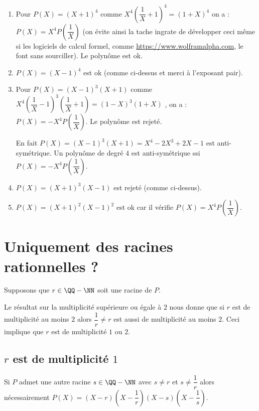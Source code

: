 \documentclass[12pt]{amsart}
\begin{document}
\begin{enumerate}
	\item Pour $P(X) = (X + 1)^4$
	      comme $X^4 \left( \dfrac1X + 1\right)^4 = (1 + X)^4$ 
	      on a : $P(X) = X^4 P\left( \dfrac1X \right)$ (on évite ainsi la tache ingrate de développer ceci même si les logiciels de calcul formel, comme  \url{https://www.wolframalpha.com},  le font sans sourciller).
	      Le polynôme est ok.

	\item $P(X) = (X - 1)^4$ est ok (comme ci-dessus et merci à l'exposant pair).
	
	\item Pour $P(X) = (X - 1)^3 (X + 1)$
	      comme $X^4 \left( \dfrac1X - 1\right)^3 \left( \dfrac1X + 1\right)
	          = (1 - X)^3 (1 + X)$ ,
	      on a : $P(X) = - X^4 P\left( \dfrac1X \right)$.
	      Le polynôme est rejeté.

	      \noindent En fait $P(X) = (X - 1)^3 (X + 1) = X^4 - 2 X^3 + 2 X - 1$ est anti-symétrique. 
	      Un polynôme de degré $4$ est anti-symétrique ssi  $P(X) = - X^4 P\left( \dfrac1X \right)$.
	
	\item $P(X) = (X + 1)^3 (X - 1)$ est rejeté (comme ci-dessus).

	\item $P(X) = (X + 1)^2 (X - 1)^2$ est ok car il vérifie $P(X) = X^4 P\left( \dfrac1X \right)$.
\end{enumerate}


\section{Uniquement des racines rationnelles ?}

Supposons que $r \in \QQ - \NN$ soit une racine de $P$.

\medskip

Le résultat sur la multiplicité supérieure ou égale à $2$ nous donne que si $r$ est de multiplicité au moins $2$ alors $\dfrac1r \neq r$ est aussi de multiplicité au moins $2$.
Ceci implique que $r$ est de multiplicité $1$ ou $2$.



\subsection*{$r$ est de multiplicité $1$}

Si $P$ admet une autre racine $s \in \QQ - \NN$ avec $s \neq r$ et $s \neq \dfrac1r$ alors nécessairement $P(X) = (X - r) \left( X - \dfrac1r \right) (X - s) \left( X - \dfrac1s \right)$.
\end{document}
